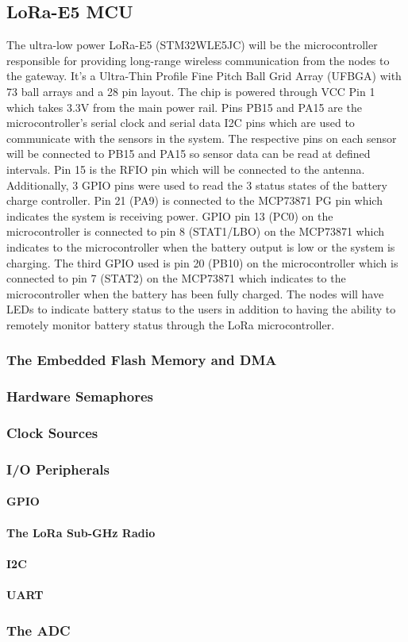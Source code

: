 \subsection{LoRa-E5 MCU}
The ultra-low power LoRa-E5 (STM32WLE5JC) will be the microcontroller responsible for providing long-range wireless communication from the nodes to the gateway. It's a Ultra-Thin Profile Fine Pitch Ball Grid Array (UFBGA) with 73 ball arrays and a 28 pin layout. The chip is powered through VCC Pin 1 which takes 3.3V from the main power rail. Pins PB15 and PA15 are the microcontroller's serial clock and serial data I2C pins which are used to communicate with the sensors in the system. The respective pins on each sensor will be connected to PB15 and PA15 so sensor data can be read at defined intervals. Pin 15 is the RFIO pin which will be connected to the antenna. Additionally, 3 GPIO pins were used to read the 3 status states of the battery charge controller. Pin 21 (PA9) is connected to the MCP73871 PG pin which indicates the system is receiving power. GPIO pin 13 (PC0) on the microcontroller is connected to pin 8 (STAT1/LBO) on the MCP73871 which indicates to the microcontroller when the battery output is low or the system is charging. The third GPIO used is pin 20 (PB10) on the microcontroller which is connected to pin 7 (STAT2) on the MCP73871 which indicates to the microcontroller when the battery has been fully  charged. The nodes will have LEDs to indicate battery status to the users in addition to having the ability to remotely monitor battery status through the LoRa microcontroller. 

\subsubsection{The Embedded Flash Memory and DMA}

\subsubsection{Hardware Semaphores}

\subsubsection{Clock Sources}

\subsubsection{I/O Peripherals}
\paragraph{GPIO}
\paragraph{The LoRa Sub-GHz Radio}
\paragraph{I2C}
\paragraph{UART}

\subsubsection{The ADC}
